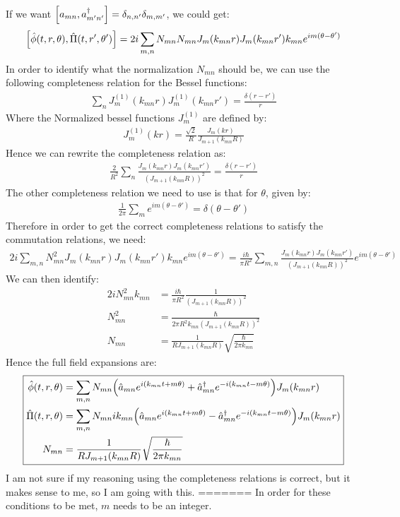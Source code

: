 \documentclass[12pt]{article}
\begin{document}
If we want $\comm{a_{mn}}{a_{m'n'}^\dag}=\delta_{n,n'}\delta_{m,m'}$, we could get:
\begin{align*}
  \comm{\hat\phi(t,r,\theta)}{\hat\Pi(t,r',\theta')}=
  2i\sum_{m,n}N_{mn}N_{mn}J_{m}(k_{mn}r)J_{m}(k_{mn}r')k_{mn}
  e^{im(\theta-\theta')}
\end{align*}
In order to identify what the normalization $N_{mn}$ should be, we can use the following completeness relation for the Bessel functions:
\begin{align*}
  \sum_{n}J^{(1)}_m(k_{mn}r)J^{(1)}_m(k_{mn}r')=\frac{\delta(r-r')}{r}
\end{align*}
Where the Normalized bessel functions $J_m^{(1)}$ are defined by:
\begin{align*}
  J^{(1)}_m(kr)=\frac{\sqrt{2}}{R}\frac{J_m(kr)}{J_{m+1}(k_{mn}R)}
\end{align*}
Hence we can rewrite the completeness relation as:
\begin{align*}
  \frac{2}{R^2}\sum_{n}\frac{J_m(k_{mn}r)J_m(k_{mn}r')}{(J_{m+1}(k_{mn}R))^2}
  =\frac{\delta(r-r')}{r}
\end{align*}
The other completeness relation we need to use is that for $\theta$, given by:
\begin{align*}
  \frac1{2\pi}\sum_me^{im(\theta-\theta')}=\delta(\theta-\theta')
\end{align*}
Therefore in order to get the correct completeness relations to satisfy the commutation relations, we need:
\begin{align*}
  2i\sum_{m,n}N_{mn}^2J_{m}(k_{mn}r)J_{m}(k_{mn}r')k_{mn}
  e^{im(\theta-\theta')}=\frac{i\hbar}{\pi R^2}
  \sum_{m,n}\frac{J_m(k_{mn}r)J_m(k_{mn}r')}{(J_{m+1}(k_{mn}R))^2}
  e^{im(\theta-\theta')}
\end{align*}
We can then identify:
\begin{align*}
  2iN_{mn}^2k_{mn}&=\frac{i\hbar}{\pi R^2}\frac1{(J_{m+1}(k_{mn}R))^2}\\
  N_{mn}^2&=\frac\hbar{2\pi R^2k_{mn}(J_{m+1}(k_{mn}R))^2}\\
  N_{mn}&=\frac1{R J_{m+1}(k_{mn}R)}\sqrt{\frac{\hbar}{2\pi k_{mn}}}
\end{align*}
Hence the full field expansions are:
\begin{equation}
  \boxed{\begin{aligned}
      \hat\phi(t,r,\theta)&=\sum_{m,n}N_{mn}\qty(
      \hat{a}_{mn}e^{i(k_{mn}t+m\theta)}+\hat{a}^\dag_{mn}e^{-i(k_{mn}t-m\theta)})
      J_m(k_{mn}r)\\
      \hat\Pi(t,r,\theta)&=\sum_{m,n}N_{mn}ik_{mn}\qty(
      \hat{a}_{mn}e^{i(k_{mn}t+m\theta)}-\hat{a}^\dag_{mn}e^{-i(k_{mn}t-m\theta)})
      J_m(k_{mn}r)\\
      N_{mn}&=\frac1{R J_{m+1}(k_{mn}R)}\sqrt{\frac{\hbar}{2\pi k_{mn}}}
    \end{aligned}}
\end{equation}
I am not sure if my reasoning using the completeness relations is correct, but it makes sense to me, so I am going with this.
=======
In order for these conditions to be met, $m$ needs to be an integer.
\end{document}
